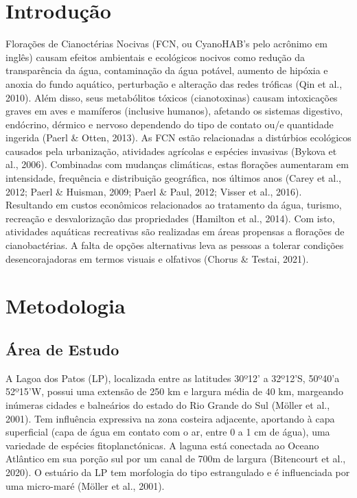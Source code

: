 \documentclass[
  super,
  preprint,
  3p]{elsarticle}
\begin{document}
    \ifdefined\Shaded\renewenvironment{Shaded}{\begin{tcolorbox}[breakable, borderline west={3pt}{0pt}{shadecolor}, sharp corners, enhanced, boxrule=0pt, interior hidden, frame hidden]}{\end{tcolorbox}}\fi

\hypertarget{introduuxe7uxe3o}{%
\section{Introdução}\label{introduuxe7uxe3o}}

Florações de Cianoctérias Nocivas (FCN, ou CyanoHAB's pelo acrônimo em
inglês) causam efeitos ambientais e ecológicos nocivos como redução da
transparência da água, contaminação da água potável, aumento de hipóxia
e anoxia do fundo aquático, perturbação e alteração das redes tróficas
(Qin et al., 2010). Além disso, seus metabólitos tóxicos (cianotoxinas)
causam intoxicações graves em aves e mamíferos (inclusive humanos),
afetando os sistemas digestivo, endócrino, dérmico e nervoso dependendo
do tipo de contato ou/e quantidade ingerida (Paerl \& Otten, 2013). As
FCN estão relacionadas a distúrbios ecológicos causados pela
urbanização, atividades agrícolas e espécies invasivas (Bykova et al.,
2006). Combinadas com mudanças climáticas, estas florações aumentaram em
intensidade, frequência e distribuição geográfica, nos últimos anos
(Carey et al., 2012; Paerl \& Huisman, 2009; Paerl \& Paul, 2012; Visser
et al., 2016). Resultando em custos econômicos relacionados ao
tratamento da água, turismo, recreação e desvalorização das propriedades
(Hamilton et al., 2014). Com isto, atividades aquáticas recreativas são
realizadas em áreas propensas a florações de cianobactérias. A falta de
opções alternativas leva as pessoas a tolerar condições desencorajadoras
em termos visuais e olfativos (Chorus \& Testai, 2021).

\hypertarget{metodologia}{%
\section{Metodologia}\label{metodologia}}

\hypertarget{uxe1rea-de-estudo}{%
\subsection{Área de Estudo}\label{uxe1rea-de-estudo}}

A Lagoa dos Patos (LP), localizada entre as latitudes 30º12' a 32º12'S,
50º40'a 52º15'W, possui uma extensão de 250 km e largura média de 40 km,
margeando inúmeras cidades e balneários do estado do Rio Grande do Sul
(Möller et al., 2001). Tem influência expressiva na zona costeira
adjacente, aportando à capa superficial (capa de água em contato com o
ar, entre 0 a 1 cm de água), uma variedade de espécies fitoplanctónicas.
A laguna está conectada ao Oceano Atlântico em sua porção sul por um
canal de 700m de largura (Bitencourt et al., 2020). O estuário da LP tem
morfologia do tipo estrangulado e é influenciada por uma micro-maré
(Möller et al., 2001).
\end{document}
